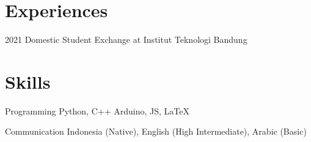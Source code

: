 \documentclass[12pt,letterpaper]{report}
\begin{document}
    \section*{Experiences}
    \begin{tablist}
        \item[2021] \tab{}Domestic Student Exchange at Institut Teknologi Bandung
    \end{tablist}

    \section*{Skills}
    \begin{tablist}
        \item[Programming] \tab{}Python, C++ Arduino, JS, \LaTeX \\
        \item[Communication] \tab{}Indonesia (Native), English (High Intermediate), Arabic (Basic) \\
    \end{tablist}
\end{document}
